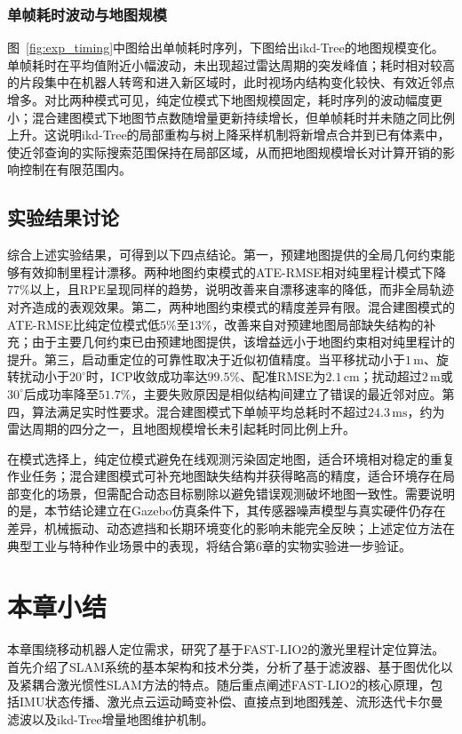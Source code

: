 \subsubsection{单帧耗时波动与地图规模}
图~\ref{fig:exp_timing}中图给出单帧耗时序列，下图给出ikd-Tree的地图规模变化。单帧耗时在平均值附近小幅波动，未出现超过雷达周期的突发峰值；耗时相对较高的片段集中在机器人转弯和进入新区域时，此时视场内结构变化较快、有效近邻点增多。对比两种模式可见，纯定位模式下地图规模固定，耗时序列的波动幅度更小；混合建图模式下地图节点数随增量更新持续增长，但单帧耗时并未随之同比例上升。这说明ikd-Tree的局部重构与树上降采样机制将新增点合并到已有体素中，使近邻查询的实际搜索范围保持在局部区域，从而把地图规模增长对计算开销的影响控制在有限范围内。

\subsection{实验结果讨论}
综合上述实验结果，可得到以下四点结论。第一，预建地图提供的全局几何约束能够有效抑制里程计漂移。两种地图约束模式的ATE-RMSE相对纯里程计模式下降$77\%$以上，且RPE呈现同样的趋势，说明改善来自漂移速率的降低，而非全局轨迹对齐造成的表观效果。第二，两种地图约束模式的精度差异有限。混合建图模式的ATE-RMSE比纯定位模式低$5\%$至$13\%$，改善来自对预建地图局部缺失结构的补充；由于主要几何约束已由预建地图提供，该增益远小于地图约束相对纯里程计的提升。第三，启动重定位的可靠性取决于近似初值精度。当平移扰动小于$1\,\mathrm{m}$、旋转扰动小于$20^{\circ}$时，ICP收敛成功率达$99.5\%$、配准RMSE为$2.1\,\mathrm{cm}$；扰动超过$2\,\mathrm{m}$或$30^{\circ}$后成功率降至$51.7\%$，主要失败原因是相似结构间建立了错误的最近邻对应。第四，算法满足实时性要求。混合建图模式下单帧平均总耗时不超过$24.3\,\mathrm{ms}$，约为雷达周期的四分之一，且地图规模增长未引起耗时同比例上升。

在模式选择上，纯定位模式避免在线观测污染固定地图，适合环境相对稳定的重复作业任务；混合建图模式可补充地图缺失结构并获得略高的精度，适合环境存在局部变化的场景，但需配合动态目标剔除以避免错误观测破坏地图一致性。需要说明的是，本节结论建立在Gazebo仿真条件下，其传感器噪声模型与真实硬件仍存在差异，机械振动、动态遮挡和长期环境变化的影响未能完全反映；上述定位方法在典型工业与特种作业场景中的表现，将结合第6章的实物实验进一步验证。

\section{本章小结}
本章围绕移动机器人定位需求，研究了基于FAST-LIO2的激光里程计定位算法。首先介绍了SLAM系统的基本架构和技术分类，分析了基于滤波器、基于图优化以及紧耦合激光惯性SLAM方法的特点。随后重点阐述FAST-LIO2的核心原理，包括IMU状态传播、激光点云运动畸变补偿、直接点到地图残差、流形迭代卡尔曼滤波以及ikd-Tree增量地图维护机制。

